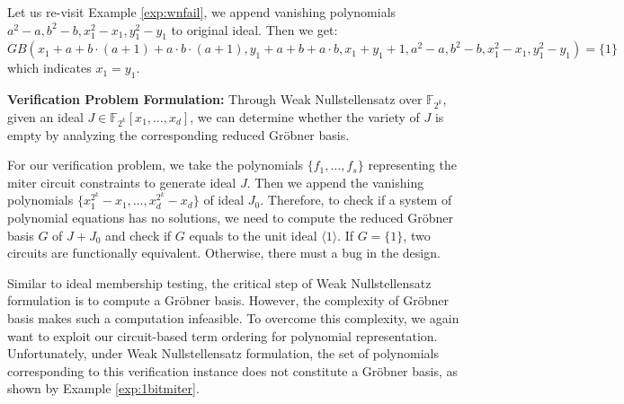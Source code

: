 \begin{Example}
Let us re-visit Example \ref{exp:wnfail}, we append vanishing polynomials $a^2-a,b^2-b,x_1^2-x_1,y_1^2-y_1$ to original ideal. 
Then we get: $GB(x_1+ a + b\cdot(a+1) + a\cdot b\cdot(a+1),y_1+a+b+a\cdot b,x_1+y_1+1,a^2-a,b^2-b,x_1^2-x_1,y_1^2-y_1)=\{1\}$ which indicates $x_1=y_1$.
\end{Example}


{\bf Verification Problem Formulation:}
Through Weak Nullstellensatz over $\mathbb{F}_{{2^k}}$, given an ideal $J \in \mathbb{F}_{2^k}[x_{1},\dots,x_{d}]$, 
we can determine whether the variety of $J$ is empty by analyzing the corresponding reduced Gr\"obner basis.

For our verification problem, we take the polynomials $\{f_1, \dots, f_s\}$ 
representing the miter circuit constraints to generate ideal $J$.
Then we append the vanishing polynomials $\{x_1^{2^k} - x_1, \dots, x_d^{2^k} - x_d\}$ of ideal $J_0$.
Therefore, to check if a system of polynomial equations
has no solutions, we need to compute the reduced Gr\"{o}bner basis $G$ of $J+J_0$
and check if $G$ equals to the unit ideal $\langle 1 \rangle$.
If $G=\{1\}$, two circuits are functionally equivalent. Otherwise, there must a bug in the design.

Similar to ideal membership testing, the critical step of Weak Nullstellensatz formulation is to compute a Gr\"obner basis.
However, the complexity of Gr\"obner basis makes such a computation infeasible. 
To overcome this complexity, we again want to exploit our circuit-based term ordering for polynomial representation. 
Unfortunately, under Weak Nullstellensatz formulation, the set of polynomials corresponding to this verification instance does not constitute 
a Gr\"obner basis, as shown by Example \ref{exp:1bitmiter}. 

	



